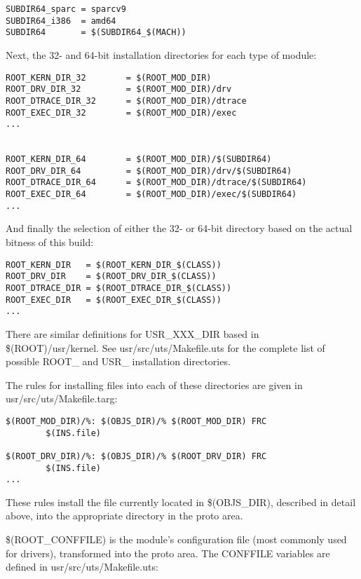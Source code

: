 \documentclass{article}
\begin{document}
\begin{verbatim}
SUBDIR64_sparc = sparcv9
SUBDIR64_i386  = amd64
SUBDIR64       = $(SUBDIR64_$(MACH))
\end{verbatim}

Next, the 32- and 64-bit installation directories for each type of module:

\begin{verbatim}
ROOT_KERN_DIR_32        = $(ROOT_MOD_DIR)
ROOT_DRV_DIR_32         = $(ROOT_MOD_DIR)/drv
ROOT_DTRACE_DIR_32      = $(ROOT_MOD_DIR)/dtrace
ROOT_EXEC_DIR_32        = $(ROOT_MOD_DIR)/exec
...


ROOT_KERN_DIR_64        = $(ROOT_MOD_DIR)/$(SUBDIR64)
ROOT_DRV_DIR_64         = $(ROOT_MOD_DIR)/drv/$(SUBDIR64)
ROOT_DTRACE_DIR_64      = $(ROOT_MOD_DIR)/dtrace/$(SUBDIR64)
ROOT_EXEC_DIR_64        = $(ROOT_MOD_DIR)/exec/$(SUBDIR64)
...
\end{verbatim}

And finally the selection of either the 32- or 64-bit directory based on the
actual bitness of this build:

\begin{verbatim}
ROOT_KERN_DIR   = $(ROOT_KERN_DIR_$(CLASS))
ROOT_DRV_DIR    = $(ROOT_DRV_DIR_$(CLASS))
ROOT_DTRACE_DIR = $(ROOT_DTRACE_DIR_$(CLASS))
ROOT_EXEC_DIR   = $(ROOT_EXEC_DIR_$(CLASS))
...
\end{verbatim}

There are similar definitions for USR\_XXX\_DIR based in \hfill \\
\$(ROOT)/usr/kernel. See usr/src/uts/Makefile.uts for the complete list of
possible ROOT\_ and USR\_ installation directories.

The rules for installing files into each of these directories are given in\-
 usr/src/uts/Makefile.targ:

\begin{verbatim}
$(ROOT_MOD_DIR)/%: $(OBJS_DIR)/% $(ROOT_MOD_DIR) FRC
        $(INS.file)

$(ROOT_DRV_DIR)/%: $(OBJS_DIR)/% $(ROOT_DRV_DIR) FRC
        $(INS.file)
...
\end{verbatim}

These rules install the file currently located in \$(OBJS\_DIR), described in
detail above, into the appropriate directory in the proto area.

\$(ROOT\_CONFFILE) is the module's configuration file (most commonly used for
drivers), transformed into the proto area. The CONFFILE variables are defined
in usr/src/uts/Makefile.uts:
\end{document}
